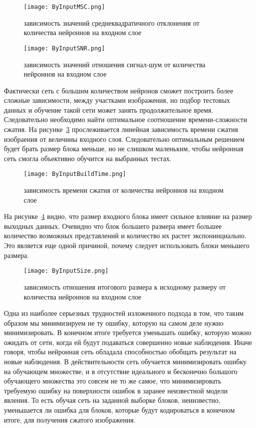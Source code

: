 \begin{figure}[ht]
\centering
  \texttt{[image: ByInputMSC.png]}
  \caption{ зависимость значений среднеквадратичного отклонения от количества нейроннов на входном слое }
  \label{fig:by_input_msc}
\end{figure}

\begin{figure}[ht]
\centering
  \texttt{[image: ByInputSNR.png]}
  \caption{ зависимость значений отношения сигнал-шум от количества нейроннов на входном слое }
  \label{fig:by_input_snr}
\end{figure}

Фактически сеть с большим количеством нейронов сможет построить более сложные зависимости, между участками изображения,
но подбор тестовых данных и обучение такой сети может занять продолжительное время. Следовательно необходимо найти оптимальное
соотношение времени-сложности сжатия. На рисунке~\ref{fig:by_input_build_time} прослеживается линейная зависимость времени сжатия изобраения
от величины входного слоя. Следовательно оптимальным решением будет брать размер блока меньше, но не слишком маленьким, чтобы нейронная сеть
смогла объективно обучится на выбранных тестах.

\begin{figure}[ht]
\centering
  \texttt{[image: ByInputBuildTime.png]}
  \caption{ зависимость времени сжатия от количества нейроннов на входном слое }
  \label{fig:by_input_build_time}
\end{figure}

На рисунке~\ref{fig:by_input_size} видно, что размер входного блока имеет сильное влияние на размер выходных данных.
Очевидно что блок большего размера имеет большее количество возможных представлений и количество их растет экспонинциально.
Это является еще одной причиной, почему следует использовать блоки меньшего размера.

\begin{figure}[ht]
\centering
  \texttt{[image: ByInputSize.png]}
  \caption{ зависимость отношения итогового размера к исходному размеру от количества нейроннов на входном слое }
  \label{fig:by_input_size}
\end{figure}

Одна из наиболее серьезных трудностей изложенного подхода в том,
что таким образом мы минимизируем не ту ошибку, которую на самом деле нужно минимизировать. В конечном итоге требуется уменьшать ошибку,
которую можно ожидать от сети, когда ей будут подаваться совершенно новые наблюдения. Иначе говоря, чтобы нейронная сеть
обладала способностью обобщать результат на новые наблюдения. В действительности сеть обучается минимизировать ошибку на обучающем множестве,
и в отсутствие идеального и бесконечно большого обучающего множества это совсем не то же самое, что минимизировать требуемую ошибку на поверхности
ошибок в заранее неизвестной модели явления. То есть обучая сеть на заданной выборке блоков, неинзвестно, уменьшается ли ошибка для блоков,
которые будут кодироваться в конечном итоге, для получения сжатого изображения.

